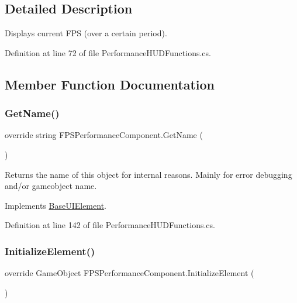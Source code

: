 \subsection{Detailed Description}
Displays current F\+PS (over a certain period). 



Definition at line 72 of file Performance\+H\+U\+D\+Functions.\+cs.



\subsection{Member Function Documentation}
\mbox{\label{class_f_p_s_performance_component_a92f903f9764b4f62cda021f0e7f05db7}} 
\subsubsection{\texorpdfstring{Get\+Name()}{GetName()}}
{\footnotesize\ttfamily override string F\+P\+S\+Performance\+Component.\+Get\+Name (\begin{DoxyParamCaption}{ }\end{DoxyParamCaption})\hspace{0.3cm}{\ttfamily [virtual]}}



Returns the name of this object for internal reasons. Mainly for error debugging and/or gameobject name. 



Implements \hyperlink{class_base_u_i_element_acb7fcd49138477941f2e43733ad9d34d}{Base\+U\+I\+Element}.



Definition at line 142 of file Performance\+H\+U\+D\+Functions.\+cs.

\mbox{\label{class_f_p_s_performance_component_a3c6259f70c2121abed18aa5414833f68}} 
\subsubsection{\texorpdfstring{Initialize\+Element()}{InitializeElement()}}
{\footnotesize\ttfamily override Game\+Object F\+P\+S\+Performance\+Component.\+Initialize\+Element (\begin{DoxyParamCaption}{ }\end{DoxyParamCaption})\hspace{0.3cm}{\ttfamily [virtual]}}



